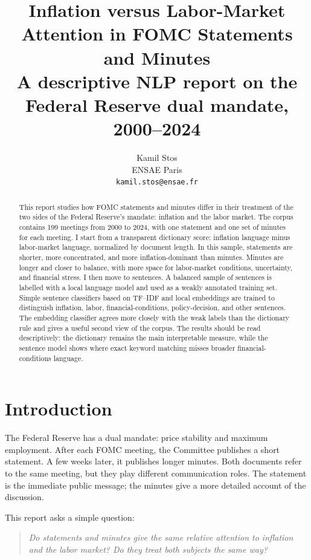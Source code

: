 \documentclass{article}
\title{
Inflation versus Labor-Market Attention in FOMC Statements and Minutes\\
\large A descriptive NLP report on the Federal Reserve dual mandate, 2000--2024
}
\author{
  Kamil Stos \\
  ENSAE Paris \\
  \texttt{kamil.stos@ensae.fr}
}
\newcommand{\fomc}{FOMC}
\newcommand{\fed}{Federal Reserve}
\newcommand{\tfidf}{TF--IDF}
\begin{document}
\maketitle

\begin{abstract}
This report studies how \fomc{} statements and minutes differ in their treatment of the
two sides of the Federal Reserve's mandate: inflation and the labor market. The corpus
contains 199 meetings from 2000 to 2024, with one statement and one set of minutes for
each meeting. I start from a transparent dictionary score: inflation language minus
labor-market language, normalized by document length. In this sample, statements are
shorter, more concentrated, and more inflation-dominant than minutes. Minutes are longer
and closer to balance, with more space for labor-market conditions, uncertainty, and
financial stress. I then move to sentences. A balanced sample of sentences is labelled
with a local language model and used as a weakly annotated training set. Simple sentence
classifiers based on \tfidf{} and local embeddings are trained to distinguish inflation,
labor, financial-conditions, policy-decision, and other sentences. The embedding
classifier agrees more closely with the weak labels than the dictionary rule and gives a
useful second view of the corpus. The results should be read descriptively: the
dictionary remains the main interpretable measure, while the sentence model shows where
exact keyword matching misses broader financial-conditions language.
\end{abstract}

\section*{Introduction}
\label{sec:introduction}

The \fed{} has a dual mandate: price stability and maximum employment. After each
\fomc{} meeting, the Committee publishes a short statement. A few weeks later, it
publishes longer minutes. Both documents refer to the same meeting, but they play
different communication roles. The statement is the immediate public message; the minutes
give a more detailed account of the discussion.

This report asks a simple question:

\begin{quote}
\emph{Do statements and minutes give the same relative attention to inflation and the labor market? Do they treat both subjects the same way?}
\end{quote}
\end{document}
